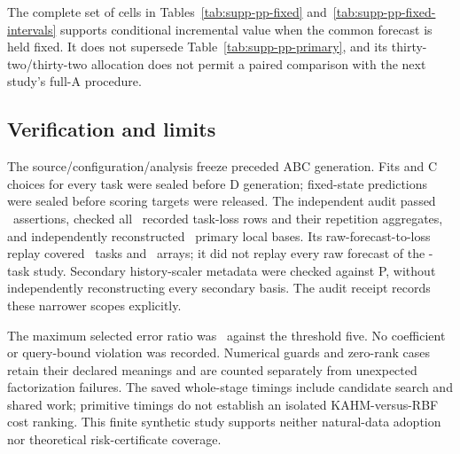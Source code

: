 The complete set of cells in Tables~\ref{tab:supp-pp-fixed}
and~\ref{tab:supp-pp-fixed-intervals} supports conditional incremental
value when the common forecast is held fixed. It does not supersede
Table~\ref{tab:supp-pp-primary}, and its thirty-two/thirty-two allocation
does not permit a paired comparison with the next study's full-A procedure.

\subsection{Verification and limits}

The source/configuration/analysis freeze preceded ABC generation. Fits and
C choices for every task were sealed before D generation; fixed-state
predictions were sealed before scoring targets were released. The
independent audit passed \PPAuditAssertions\ assertions, checked all
\PPAuditLossRows\ recorded task-loss rows and their repetition aggregates,
and independently reconstructed \PPAuditBases\ primary local bases.
Its raw-forecast-to-loss replay covered \PPAuditRawTasks\ tasks and
\PPAuditRawArrays\ arrays; it did not replay every raw forecast of the
\PPTasks-task study. Secondary history-scaler metadata were checked
against P, without independently reconstructing every secondary basis.
The audit receipt records these narrower scopes explicitly.

The maximum selected error ratio was \PPMaxErrorRatio\ against the
threshold five. No coefficient or query-bound violation was recorded.
Numerical guards and zero-rank cases retain their declared meanings and
are counted separately from unexpected factorization failures. The saved
whole-stage timings include candidate search and shared work; primitive
timings do not establish an isolated KAHM-versus-RBF cost ranking.
This finite synthetic study supports neither natural-data adoption nor
theoretical risk-certificate coverage.

